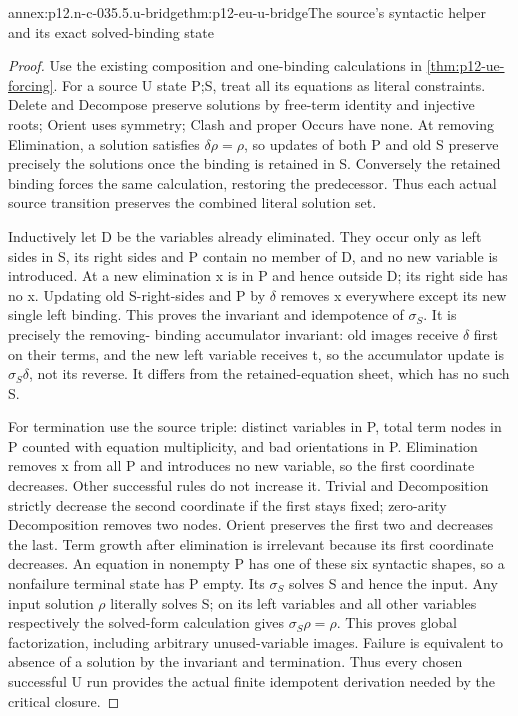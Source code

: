 \begin{annexitem}{annex:p12.n-c-035.5.u-bridge}{thm:p12-eu-u-bridge}{The source's syntactic helper and its exact solved-binding state}
\begin{proof}
Use the existing composition and one-binding calculations in
\cref{thm:p12-ue-forcing}. For a source U state P;S, treat all
its equations as literal constraints. Delete and Decompose preserve
solutions by free-term identity and injective roots; Orient uses
symmetry; Clash and proper Occurs have none. At removing Elimination,
a solution satisfies \(\delta\rho=\rho\), so updates of both
P and old S preserve precisely the solutions once the binding is
retained in S. Conversely the retained binding forces the same
calculation, restoring the predecessor. Thus each actual source
transition preserves the combined literal solution set.

Inductively let D be the variables already eliminated. They occur
only as left sides in S, its right sides and P contain no member
of D, and no new variable is introduced. At a new elimination
x is in P and hence outside D; its right side has no x. Updating
old S-right-sides and P by \(\delta\) removes x everywhere
except its new single left binding. This proves the invariant
and idempotence of \(\sigma_S\). It is precisely the removing-
binding accumulator invariant: old images receive \(\delta\)
first on their terms, and the new left variable receives t, so
the accumulator update is \(\sigma_S\delta\), not its reverse.
It differs from the retained-equation sheet, which has no such S.

For termination use the source triple: distinct variables in P,
total term nodes in P counted with equation multiplicity, and bad
orientations in P. Elimination removes x from all P and introduces
no new variable, so the first coordinate decreases. Other successful
rules do not increase it. Trivial and Decomposition strictly
decrease the second coordinate if the first stays fixed; zero-arity
Decomposition removes two nodes. Orient preserves the first two
and decreases the last. Term growth after elimination is irrelevant
because its first coordinate decreases. An equation in nonempty P
has one of these six syntactic shapes, so a nonfailure terminal
state has P empty. Its \(\sigma_S\) solves S and hence the input.
Any input solution \(\rho\) literally solves S; on its left
variables and all other variables respectively the solved-form
calculation gives \(\sigma_S\rho=\rho\). This proves global
factorization, including arbitrary unused-variable images. Failure
is equivalent to absence of a solution by the invariant and
termination. Thus every chosen successful U run provides the
actual finite idempotent derivation needed by the critical closure.
\end{proof}
\end{annexitem}

